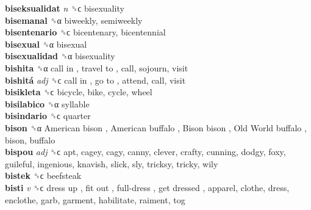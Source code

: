 \textbf{biseksualidat} \emph{n}  ␝ϲ  bisexuality  \\
\textbf{bisemanal} ␝α  biweekly, semiweekly  \\
\textbf{bisentenario} ␝ϲ  bicentenary, bicentennial  \\
\textbf{bisexual} ␝α  bisexual  \\
\textbf{bisexualidad} ␝α  bisexuality  \\
\textbf{bishita} ␝α   call in ,  travel to , call, sojourn, visit  \\
\textbf{bishitá} \emph{adj}  ␝ϲ   call in ,  go to , attend, call, visit  \\
\textbf{bisikleta} ␝ϲ  bicycle, bike, cycle, wheel  \\
\textbf{bisilabico} ␝α  syllable  \\
\textbf{bisindario} ␝ϲ  quarter  \\
\textbf{bison} ␝α   American bison ,  American buffalo ,  Bison bison ,  Old World buffalo , bison, buffalo  \\
\textbf{bispou} \emph{adj}  ␝ϲ  apt, cagey, cagy, canny, clever, crafty, cunning, dodgy, foxy, guileful, ingenious, knavish, slick, sly, tricksy, tricky, wily  \\
\textbf{bistek} ␝ϲ  beefsteak  \\
\textbf{bisti} \emph{v}  ␝ϲ   dress up ,  fit out ,  full-dress ,  get dressed , apparel, clothe, dress, enclothe, garb, garment, habilitate, raiment, tog  \\
